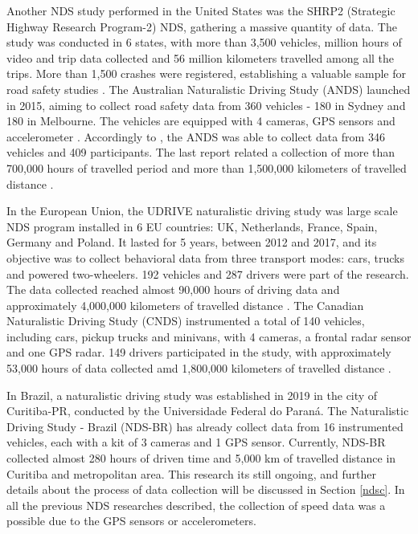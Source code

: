 Another NDS study performed in the United States was the SHRP2 (Strategic Highway Research Program-2) NDS, gathering a massive quantity of data. The study was conducted in 6 states, with more than 3,500 vehicles, million hours of video and trip data collected and 56 million kilometers travelled among all the trips. More than 1,500 crashes were registered, establishing a valuable sample for road safety studies \cite{Njord2015}. The Australian Naturalistic Driving Study (ANDS) launched in 2015, aiming to collect road safety data from 360 vehicles - 180 in Sydney and 180 in Melbourne. The vehicles are equipped with 4 cameras, GPS sensors and accelerometer \cite{ANDS2017a}. Accordingly to \textcite{Larue2019}, the ANDS was able to collect data from 346 vehicles and 409 participants. The last report related a collection of more than 700,000 hours of travelled period and more than 1,500,000 kilometers of travelled distance \cite{ANDS2017a}. 

In the European Union, the UDRIVE naturalistic driving study was large scale NDS program installed in 6 EU countries: UK, Netherlands, France, Spain, Germany and Poland. It lasted for 5 years, between 2012 and 2017, and its objective was to collect behavioral data from three transport modes: cars, trucks and powered two-wheelers. 192 vehicles and 287 drivers were part of the research. The data collected reached almost 90,000 hours of driving data and approximately 4,000,000 kilometers of travelled distance \cite{VanNes2019}. The Canadian Naturalistic Driving Study (CNDS) instrumented a total of 140 vehicles, including cars, pickup trucks and minivans, with 4 cameras, a frontal radar sensor and one GPS radar. 149 drivers participated in the study, with approximately 53,000 hours of data collected amd 1,800,000 kilometers of travelled distance \cite{CNDS2021}. 


In Brazil, a naturalistic driving study was established in 2019 in the city of Curitiba-PR, conducted by the Universidade Federal do Paraná. The Naturalistic Driving Study - Brazil (NDS-BR) has already collect data from 16 instrumented vehicles, each with a kit of 3 cameras and 1 GPS sensor. Currently, NDS-BR collected almost 280 hours of driven time and 5,000 km of travelled distance in Curitiba and metropolitan area. This research its still ongoing, and further details about the process of data collection will be discussed in Section \ref{ndsc}. In all the previous NDS researches described, the collection of speed data was a possible due to the GPS sensors or accelerometers.

